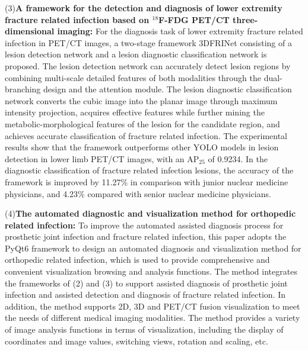 \begin{eabstract}
    (3)\textbf{A framework for the detection and diagnosis of lower extremity fracture related infection based on \(^{18}\)F-FDG PET/CT three-dimensional imaging: }For the diagnosis task of lower extremity fracture related infection in PET/CT images, a two-stage framework 3DFRINet consisting of a lesion detection network and a lesion diagnostic classification network is proposed. The lesion detection network can accurately detect lesion regions by combining multi-scale detailed features of both modalities through the dual-branching design and the attention module. The lesion diagnostic classification network converts the cubic image into the planar image through maximum intensity projection, acquires effective features while further mining the metabolic-morphological features of the lesion for the candidate region, and achieves accurate classification of fracture related infection. The experimental results show that the framework outperforms other YOLO models in lesion detection in lower limb PET/CT images, with an AP\(_{25}\) of 0.9234. In the diagnostic classification of fracture related infection lesions, the accuracy of the framework is improved by 11.27\% in comparison with junior nuclear medicine physicians, and 4.23\% compared with senior nuclear medicine physicians.

    (4)\textbf{The automated diagnostic and visualization method for orthopedic related infection: }To improve the automated assisted diagnosis process for prosthetic joint infection and fracture related infection, this paper adopts the PyQt6 framework to design an automated diagnosis and visualization method for orthopedic related infection, which is used to provide comprehensive and convenient visualization browsing and analysis functions. The method integrates the frameworks of (2) and (3) to support assisted diagnosis of prosthetic joint infection and assisted detection and diagnosis of fracture related infection. In addition, the method supports 2D, 3D and PET/CT fusion visualization to meet the needs of different medical imaging modalities. The method provides a variety of image analysis functions in terms of visualization, including the display of coordinates and image values, switching views, rotation and scaling, etc.

\end{eabstract}

